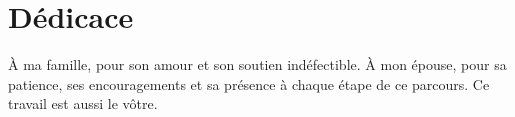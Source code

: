 \chapter*{Dédicace}

À ma famille, pour son amour et son soutien indéfectible.
À mon épouse, pour sa patience, ses encouragements et sa présence à chaque étape de ce parcours.
Ce travail est aussi le vôtre.